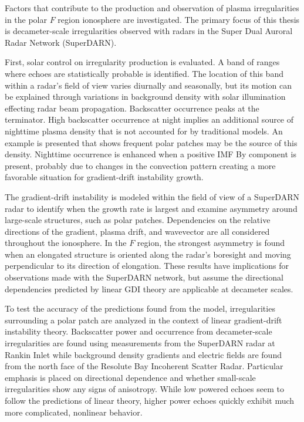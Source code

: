 
Factors that contribute to the production and observation of plasma irregularities in the polar \(F\) region ionosphere are investigated.  The primary focus of this thesis is decameter-scale irregularities observed with radars in the Super Dual Auroral Radar Network (SuperDARN).

First, solar control on irregularity production is evaluated.  A band of ranges where echoes are statistically probable is identified.  The location of this band within a radar's field of view varies diurnally and seasonally, but its motion can be explained through variations in background density with solar illumination effecting radar beam propagation.  Backscatter occurrence peaks at the terminator.  High backscatter occurrence at night implies an additional source of nighttime plasma density that is not accounted for by traditional models.  An example is presented that shows frequent polar patches may be the source of this density.  Nighttime occurrence is enhanced when a positive IMF By component is present, probably due to changes in the convection pattern creating a more favorable situation for gradient-drift instability growth.

The gradient-drift instability is modeled within the field of view of a SuperDARN radar to identify when the growth rate is largest and examine asymmetry around large-scale structures, such as polar patches.  Dependencies on the relative directions of the gradient, plasma drift, and wavevector are all considered throughout the ionosphere.  In the \(F\) region, the strongest asymmetry is found when an elongated structure is oriented along the radar's boresight and moving perpendicular to its direction of elongation.  These results have implications for observations made with the SuperDARN network, but assume the directional dependencies predicted by linear GDI theory are applicable at decameter scales.

To test the accuracy of the predictions found from the model, irregularities surrounding a polar patch are analyzed in the context of linear gradient-drift instability theory.  Backscatter power and occurrence from decameter-scale irregularities are found using measurements from the SuperDARN radar at Rankin Inlet while background density gradients and electric fields are found from the north face of the Resolute Bay Incoherent Scatter Radar.  Particular emphasis is placed on directional dependence and whether small-scale irregularities show any signs of anisotropy.  While low powered echoes seem to follow the predictions of linear theory, higher power echoes quickly exhibit much more complicated, nonlinear behavior.